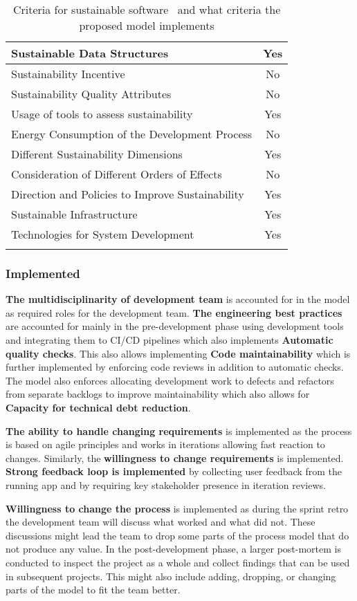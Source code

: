 \begin{longtable}{ |l|c| }
\hline
Sustainable Data Structures & Yes\\
\hline
Sustainability Incentive & No\\
\hline
Sustainability Quality Attributes & No\\
\hline
Usage of tools to assess sustainability & Yes\\
\hline
Energy Consumption of the Development Process & No\\
\hline
Different Sustainability Dimensions & Yes\\
\hline
Consideration of Different Orders of Effects & No\\
\hline
Direction and Policies to Improve Sustainability & Yes\\
\hline
Sustainable Infrastructure & Yes\\
\hline
Technologies for System Development & Yes\\
\hline
\caption{Criteria for sustainable software~\cite{assesmentcriteriaforsustainable} and what criteria the proposed model implements }
\label{criteriaforsustainable}
\end{longtable}

\subsubsection{Implemented}
\textbf{The multidisciplinarity of development team} is accounted for in the model as required roles for the development team. \textbf{The engineering best practices} are accounted for mainly in the pre-development phase using development tools and integrating them to CI/CD pipelines which also implements \textbf{Automatic quality checks}. This also allows implementing \textbf{Code maintainability} which is further implemented by enforcing code reviews in addition to automatic checks. The model also enforces allocating development work to defects and refactors from separate backlogs to improve maintainability which also allows for \textbf{Capacity for technical debt reduction}. 

\textbf{The ability to handle changing requirements} is implemented as the process is based on agile principles and works in iterations allowing fast reaction to changes. Similarly, the \textbf{willingness to change requirements} is implemented. \textbf{Strong feedback loop is implemented} by collecting user feedback from the running app and by requiring key stakeholder presence in iteration reviews.

\textbf{Willingness to change the process} is implemented as during the sprint retro the development team will discuss what worked and what did not. These discussions might lead the team to drop some parts of the process model that do not produce any value. In the post-development phase, a larger post-mortem is conducted to inspect the project as a whole and collect findings that can be used in subsequent projects. This might also include adding, dropping, or changing parts of the model to fit the team better.

